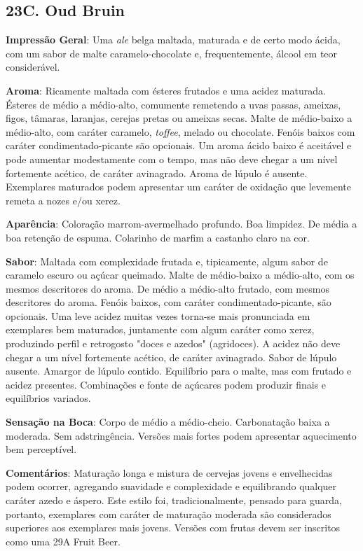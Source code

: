 \subsection*{23C. Oud Bruin}
\textbf{Impressão Geral}: Uma \textit{ale} belga maltada, maturada e de certo modo ácida, com um sabor de malte caramelo-chocolate e, frequentemente, álcool em teor considerável.

\textbf{Aroma}: Ricamente maltada com ésteres frutados e uma acidez maturada. Ésteres de médio a médio-alto, comumente remetendo a uvas passas, ameixas, figos, tâmaras, laranjas, cerejas pretas ou ameixas secas. Malte de médio-baixo a médio-alto, com caráter caramelo, \textit{toffee}, melado ou chocolate. Fenóis baixos com caráter condimentado-picante são opcionais. Um aroma ácido baixo é aceitável e pode aumentar modestamente com o tempo, mas não deve chegar a um nível fortemente acético, de caráter avinagrado. Aroma de lúpulo é ausente. Exemplares maturados podem apresentar um caráter de oxidação que levemente remeta a nozes e/ou xerez.

\textbf{Aparência}: Coloração marrom-avermelhado profundo. Boa limpidez. De média a boa retenção de espuma. Colarinho de marfim a castanho claro na cor.

\textbf{Sabor}: Maltada com complexidade frutada e, tipicamente, algum sabor de caramelo escuro ou açúcar queimado. Malte de médio-baixo a médio-alto, com os mesmos descritores do aroma. De médio a médio-alto frutado, com mesmos descritores do aroma. Fenóis baixos, com caráter condimentado-picante, são opcionais. Uma leve acidez muitas vezes torna-se mais pronunciada em exemplares bem maturados, juntamente com algum caráter como xerez, produzindo perfil e retrogosto "doces e azedos" (agridoces). A acidez não deve chegar a um nível fortemente acético, de caráter avinagrado. Sabor de lúpulo ausente. Amargor de lúpulo contido. Equilíbrio para o malte, mas com frutado e acidez presentes. Combinações e fonte de açúcares podem produzir finais e equilíbrios variados.

\textbf{Sensação na Boca}: Corpo de médio a médio-cheio. Carbonatação baixa a moderada. Sem adstringência. Versões mais fortes podem apresentar aquecimento bem perceptível.

\textbf{Comentários}: Maturação longa e mistura de cervejas jovens e envelhecidas podem ocorrer, agregando suavidade e complexidade e equilibrando qualquer caráter azedo e áspero. Este estilo foi, tradicionalmente, pensado para guarda, portanto, exemplares com caráter de maturação moderada são considerados superiores aos exemplares mais jovens. Versões com frutas devem ser inscritos como uma 29A Fruit Beer.

